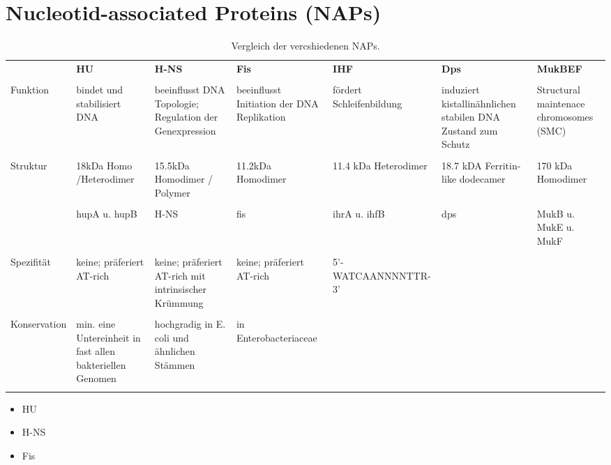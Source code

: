 \section{Nucleotid-associated Proteins (NAPs)} 
\begin{table}[H]
    \centering
    \scriptsize
    \begin{tabular}{p{1.5cm}p{2cm}p{2cm}p{2cm}p{2cm}p{2cm}p{2cm}}
         & \normalsize \textbf{HU}  & \normalsize\textbf{H-NS} & \normalsize\textbf{Fis} & \normalsize\textbf{IHF}  &   \normalsize\textbf{Dps}   & \normalsize\textbf{MukBEF} \\  \\
        
        Funktion & bindet und stabilisiert DNA & beeinflusst DNA Topologie; Regulation der Genexpression & beeinflusst Initiation der DNA Replikation & fördert Schleifenbildung & induziert kistallinähnlichen stabilen DNA Zustand zum Schutz & Structural maintenace chromosomes (SMC)\\ \\
        Struktur & 18kDa Homo /Heterodimer & 15.5kDa Homodimer / Polymer & 11.2kDa Homodimer & 11.4 kDa Heterodimer & 18.7 kDA Ferritin-like dodecamer & 170 kDa Homodimer \\ \\
         & hupA u. hupB & H-NS & fis & ihrA u. ihfB & dps & MukB u. MukE u. MukF \\ \\
        Spezifität & keine; präferiert AT-rich & keine; präferiert AT-rich mit intrinsischer Krümmung & keine; präferiert AT-rich & 5'-WATCAANNNNTTR-3' &  \\ \\
        Konservation & min. eine Untereinheit in fast allen bakteriellen Genomen & hochgradig in E. coli und ähnlichen Stämmen & in Enterobacteriaceae & \\ \\
    \end{tabular}
    \caption{Vergleich der vercshiedenen NAPs.}
    \label{tab:napvergleich}
\end{table}       
  

\begin{mechanism}[title=Nennen Sie 3 NAPs.]
\begin{itemize}
    \item HU
    \item H-NS
    \item Fis
\end{itemize}
\end{mechanism}

